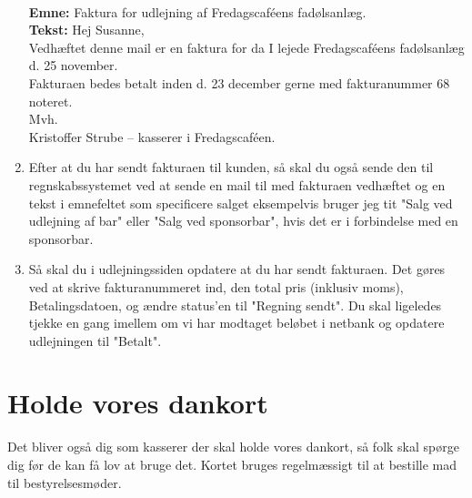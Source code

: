 \begin{enumerate}
    \\
    \textbf{Emne: } Faktura for udlejning af Fredagscaféens fadølsanlæg.\\
    \textbf{Tekst: } Hej Susanne,\\
    Vedhæftet denne mail er en faktura for da I lejede Fredagscaféens fadølsanlæg d. 25 november.\\
    Fakturaen bedes betalt inden d. 23 december gerne med fakturanummer 68 noteret.\\
    Mvh.\\
    Kristoffer Strube – kasserer i Fredagscaféen.
    \item Efter at du har sendt fakturaen til kunden, så skal du også sende den til regnskabssystemet ved at sende en mail til  med fakturaen vedhæftet og en tekst i emnefeltet som specificere salget eksempelvis bruger jeg tit "Salg ved udlejning af bar" eller "Salg ved sponsorbar", hvis det er i forbindelse med en sponsorbar.
    \item Så skal du i udlejningssiden opdatere at du har sendt fakturaen. Det gøres ved at skrive fakturanummeret ind, den total pris (inklusiv moms), Betalingsdatoen, og ændre status'en til "Regning sendt". Du skal ligeledes tjekke en gang imellem om vi har modtaget beløbet i netbank og opdatere udlejningen til "Betalt".
\end{enumerate}

\section{Holde vores dankort}
Det bliver også dig som kasserer der skal holde vores dankort, så folk skal spørge dig før de kan få lov at bruge det. Kortet bruges regelmæssigt til at bestille mad til bestyrelsesmøder.

